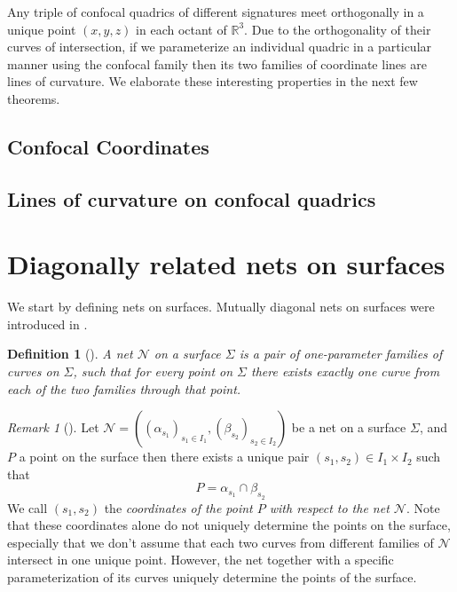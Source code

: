 \documentclass[12pt,a4paper]{article}
\theoremstyle{BoldTopSpacing}
\theoremstyle{BoldTopSpacing}
\theoremstyle{BoldTopSpacing}
\theoremstyle{BoldTopBottomSpacing}
\newtheorem{definition}{Definition}[section]
\theoremstyle{BoldTopSpacing}
\theoremstyle{BoldTopBottomSpacing}
\theoremstyle{remark}
\newtheorem{remark}{\textit{Remark}}[section]
\begin{document}
Any triple of confocal quadrics of different signatures meet orthogonally in a unique point $(x, y, z)$ in each octant of $\mathbb{R}^3$. Due to the orthogonality of their curves of intersection, if we parameterize an individual quadric in a particular manner using the confocal family then its two families of coordinate lines are lines of curvature. We elaborate these interesting properties in the next few theorems.

\subsection{Confocal Coordinates}
\label{subsec:confocal-coordinates}

\subsection{Lines of curvature on confocal quadrics}
\label{subsec:curvature-lines-on-quadrics}
\pagebreak
\section{Diagonally related nets on surfaces}
\label{sec:diagonally-related-nets}

We start by defining nets on surfaces. Mutually diagonal nets on surfaces were introduced in \cite{MutuallyDiagonalNets2019}.

\begin{definition}[]
\label{def:nets-on-surfaces}
A net $\mathcal{N}$ on a surface $\Sigma$ is a pair of one-parameter families of curves on $\Sigma$, such that for every point on $\Sigma$ there exists exactly one curve from each of the two families through that point.
\end{definition}

\begin{remark}[]
\label{rm:label}
Let $\mathcal{N} = \left( (\alpha_{s_{1}})_{s_{1} \in I_1}, (\beta_{s_{2}})_{s_{2} \in I_2} \right)$ be a net on a surface
$\Sigma$, and $P$ a point on the surface then there exists a unique pair $(s_{1}, s_{2}) \in I_{1}\times I_{2}$ such that
\[
    P = \alpha_{s_1} \cap \beta_{s_2}
\]
We call $(s_1, s_2)$ the \textit{coordinates of the point $P$ with respect to the net $\mathcal{N}$}. Note that these coordinates alone do not uniquely determine the points on the surface, especially that we don't assume that each two curves from different families of $\mathcal{N}$ intersect in one unique point. However, the net together with a specific parameterization of its curves uniquely determine the points of the surface.
\end{remark}
\end{document}
